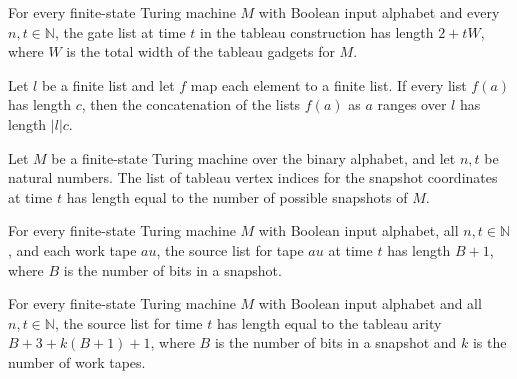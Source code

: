 \begin{theorem}
\label{Complexity.length_tableauGates}
\leanok
{}
For every finite-state Turing machine $M$ with Boolean input alphabet and every
$n,t\in\mathbb{N}$, the gate list at time $t$ in the tableau construction has length
$2+tW$, where $W$ is the total width of the tableau gadgets for $M$.
\end{theorem}

\begin{theorem}
\label{Complexity.CfgTableau.length_flatMap_const}
\leanok
{}
Let $l$ be a finite list and let $f$ map each element to a finite list. If every list
$f(a)$ has length $c$, then the concatenation of the lists $f(a)$ as $a$ ranges over $l$
has length $|l|c$.
\end{theorem}

\begin{theorem}
\label{Complexity.length_tableauBlock}
\leanok
{}
Let $M$ be a finite-state Turing machine over the binary alphabet, and let $n,t$ be
natural numbers. The list of tableau vertex indices for the snapshot coordinates at time
$t$ has length equal to the number of possible snapshots of $M$.
\end{theorem}

\begin{theorem}
\label{Complexity.length_tableauTapeSources}
\leanok
{}
For every finite-state Turing machine $M$ with Boolean input alphabet, all
$n,t\in\mathbb{N}$, and each work tape $	au$, the source list for tape $	au$ at time $t$
has length $B+1$, where $B$ is the number of bits in a snapshot.
\end{theorem}

\begin{theorem}
\label{Complexity.length_tableauSources}
\leanok
{}
For every finite-state Turing machine $M$ with Boolean input alphabet and all
$n,t\in\mathbb{N}$, the source list for time $t$ has length equal to the tableau arity
$B+3+k(B+1)+1$, where $B$ is the number of bits in a snapshot and $k$ is the number of
work tapes.
\end{theorem}

